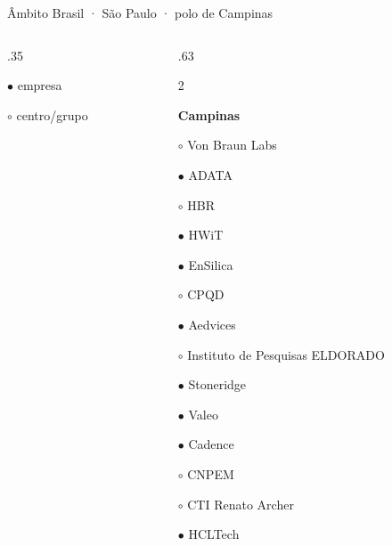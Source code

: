 \begin{frame}{Âmbito Brasil · São Paulo · polo de Campinas}
\begin{columns}[T,onlytextwidth]
\begin{column}{.35\textwidth}
{\tiny $\bullet$ empresa\par $\circ$ centro/grupo}
\end{column}
\begin{column}{.63\textwidth}
\footnotesize\setlength{\columnsep}{3mm}\begin{multicols}{2}\raggedright
\textcolor{blue_theme}{\textbf{Campinas}}\par\smallskip
\noindent\parbox{\linewidth}{$\circ$ Von Braun Labs}\par
\noindent\parbox{\linewidth}{$\bullet$ ADATA}\par
\noindent\parbox{\linewidth}{$\circ$ HBR}\par
\noindent\parbox{\linewidth}{$\bullet$ HWiT}\par
\noindent\parbox{\linewidth}{$\bullet$ EnSilica}\par
\noindent\parbox{\linewidth}{$\circ$ CPQD}\par
\noindent\parbox{\linewidth}{$\bullet$ Aedvices}\par
\noindent\parbox{\linewidth}{$\circ$ Instituto de Pesquisas ELDORADO}\par
\noindent\parbox{\linewidth}{$\bullet$ Stoneridge}\par
\noindent\parbox{\linewidth}{$\bullet$ Valeo}\par
\noindent\parbox{\linewidth}{$\bullet$ Cadence}\par
\noindent\parbox{\linewidth}{$\circ$ CNPEM}\par
\noindent\parbox{\linewidth}{$\circ$ CTI Renato Archer}\par
\noindent\parbox{\linewidth}{$\bullet$ HCLTech}\par
\medskip
\end{multicols}
\end{column}
\end{columns}
\creditoBrasil
\end{frame}
